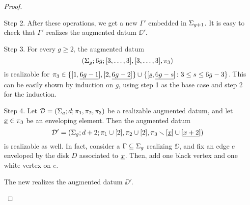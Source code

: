 \begin{proof}
\begin{sideline}{Step 2.}
\egroup
After these operations, we get a new \dessin{} $\Gamma'$ embedded in $\Sigma_{g+1}$. It is easy to check that $\Gamma'$ realizes the augmented datum $\DD'$.
\end{sideline}
\begin{sideline}{Step 3.}
For every $g\ge 2$, the augmented datum 
\[
(\Sigma_{g};6g;[3,\ldots,3],[3,\ldots,3],\pi_3)
\]
is realizable for $\pi_3\in\{[1,\underline{6g-1}],[2,\underline{6g-2}]\}\cup\{[\underline{s},\underline{6g-s}]\colon 3\le s\le 6g-3\}$. This can be easily shown by induction on $g$, using step 1 as the base case and step 2 for the induction.
\end{sideline}
\def\myscale{1.5}
\begin{sideline}{Step 4.}
Let $\mathcal{D}=(\Sigma_{g};d;\pi_1,\pi_2,\pi_3)$ be a realizable augmented datum, and let $\underline{x}\in\pi_3$ be an enveloping element. Then the augmented datum
\[
\mathcal{D}'=(\Sigma_{g};d+2;\pi_1\cup[2],\pi_2\cup[2],\pi_3\smallsetminus[\underline{x}]\cup[\underline{x+2}])
\]
is realizable as well. In fact, consider a \dessin{} $\Gamma\subseteq\Sigma_{g}$ realizing $\DD$, and fix an edge $e$ enveloped by the disk $D$ associated to $\underline{x}$. Then, add one black vertex and one white vertex on $e$.
\begin{center}
\def\picturesetup{
\begin{pgfonlayer}{graph edge below}
\begin{scope}
\clip (-.8,0) to[bend left=90] (.8,0) to[bend left=90] (-.8,0);
\fill[disk 1] circle(3);
\draw[disk 1 boundary enveloped,line width=\edgelinewidth] (-.5,0) pic{black vertex} to (.5,0) pic {white vertex};
\path[black edge] (-.5,0) to (-1,0);
\path[black edge] (.5,0) to (1,0);
\end{scope}
\end{pgfonlayer}
}
\end{center}
The new \dessin{} realizes the augmented datum $\DD'$.
\end{sideline}


\end{proof}

